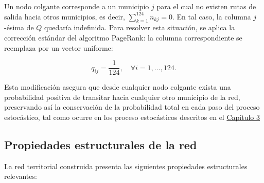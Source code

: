 \documentclass[
  spanish,
  us-letterpaper,
]{scrreprt}
\numberwithin{equation}{section}
\begin{document}
Un nodo colgante corresponde a un municipio \(j\) para el cual no
existen rutas de salida hacia otros municipios, es decir,
\(\sum_{k=1}^{124} n_{kj} = 0\). En tal caso, la columna \(j\)-ésima de
\(Q\) quedaría indefinida. Para resolver esta situación, se aplica la
corrección estándar del algoritmo PageRank: la columna correspondiente
se reemplaza por un vector uniforme:

\[
q_{ij} = \frac{1}{124}, \quad \forall i = 1,\dots,124.
\]

Esta modificación asegura que desde cualquier nodo colgante exista una
probabilidad positiva de transitar hacia cualquier otro municipio de la
red, preservando así la conservación de la probabilidad total en cada
paso del proceso estocástico, tal como ocurre en los proceso
estocásticos descritos en el \hyperref[sec-estocasticossegundo]{Capítulo
3}

\subsection{Propiedades estructurales de la
red}\label{propiedades-estructurales-de-la-red}

La red territorial construida presenta las siguientes propiedades
estructurales relevantes:
\end{document}
